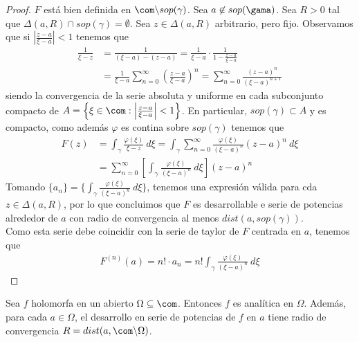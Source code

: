 \begin{proof}
$F$ está bien definida en $\com \backslash sop(\gamma)$. Sea $a \not \in sop(\gama)$. Sea $R > 0$ tal que $\Delta(a,R) \cap sop(\gamma) = \emptyset$. Sea $z \in \Delta(a,R)$ arbitrario, pero fijo. Observamos que si $\left| \frac{z-a}{\xi - a} \right| < 1$ tenemos que
\begin{align*}
    \frac{1}{\xi - z} &= \frac{1}{(\xi - a) - (z - a)} = \frac{1}{\xi - a} \cdot \frac{1}{1 - \frac{z-a}{\xi - a}} \\
    &= \frac{1}{\xi - a} \sum_{n=0}^{\infty}{\left( \frac{z-a}{\xi -a}\right)^n} = \sum_{n=0}^{\infty}{\frac{(z-a)^n}{(\xi -a)^{n+1}}}
\end{align*}
siendo la convergencia de la serie absoluta y uniforme en cada subconjunto compacto de $A = \left\{ \xi \in \com : \left| \frac{z-a}{\xi - a} \right| < 1 \right\}$. En particular, $sop(\gamma) \subset A$ y es compacto, como además $\varphi$ es contina sobre $sop(\gamma)$ tenemos que
\begin{align*}
    F(z) &= \int_{\gamma}{\frac{\varphi(\xi)}{\xi - z} \ d\xi} = \int_{\gamma}{\sum_{n=0}^{\infty}{\frac{\varphi(\xi)}{(\xi - a)^{n}}}(z-a)^{n} \ d\xi} \\
    &= {\sum_{n=0}^{\infty}{\left[\int_{\gamma}\frac{\varphi(\xi)}{(\xi - a)^{n}} \ d\xi \right]}(z-a)^{n} }
\end{align*}
Tomando $\{a_n\} = \{\int_{\gamma}\frac{\varphi(\xi)}{(\xi - a)^{n}} \ d\xi \} $, tenemos una expresión válida para cda $z \in \Delta(a,R)$, por lo que concluimos que $F$ es desarrollable e serie de potencias alrededor de $a$ con radio de convergencia al menos $dist(a,sop(\gamma))$.
\\
\newline
Como esta serie debe coincidir con la serie de taylor de $F$ centrada en $a$, tenemos que
\begin{align*}
    F^{(n)}(a) = n! \cdot a_n = n!\int_{\gamma}\frac{\varphi(\xi)}{(\xi - a)^{n}} \ d\xi 
\end{align*}
\end{proof}

\begin{teo}
Sea $f$ holomorfa en un abierto $\Omega \subseteq \com$. Entonces $f$ es analítica en $\Omega$. Además, para cada $a \in \Omega$, el desarrollo en serie de potencias de $f$ en $a$ tiene radio de convergencia $R = dist(a, \com \backslash \Omega)$.
\end{teo}

